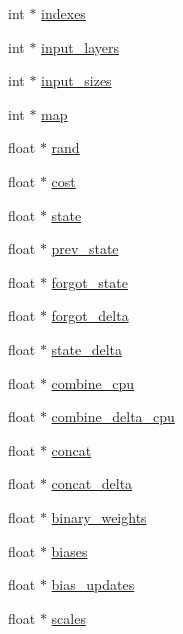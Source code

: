 \begin{DoxyCompactItemize}
\item 
int $\ast$ \mbox{\hyperlink{structlayer_a545ce2f1db475b370db778c433913fde}{indexes}}
\item 
int $\ast$ \mbox{\hyperlink{structlayer_afd5797d71336f51f9b5b1bd1ef0bddd8}{input\+\_\+layers}}
\item 
int $\ast$ \mbox{\hyperlink{structlayer_aef52d6a821c836ddd1b1993911c648f2}{input\+\_\+sizes}}
\item 
int $\ast$ \mbox{\hyperlink{structlayer_a9950b1b44120256269e082cb5efbd42e}{map}}
\item 
float $\ast$ \mbox{\hyperlink{structlayer_a254a888ee1b4383a7ce6035a88e7b825}{rand}}
\item 
float $\ast$ \mbox{\hyperlink{structlayer_a9a71dbf0ad70f63a10787d8217633776}{cost}}
\item 
float $\ast$ \mbox{\hyperlink{structlayer_af47d59ee97d2b512e5ca64a25af476c1}{state}}
\item 
float $\ast$ \mbox{\hyperlink{structlayer_aa82477e38a85af20ebd0300cab6ea6e1}{prev\+\_\+state}}
\item 
float $\ast$ \mbox{\hyperlink{structlayer_a8c96fb4f8b4a7d7dac14d6220938bdc3}{forgot\+\_\+state}}
\item 
float $\ast$ \mbox{\hyperlink{structlayer_a03015ecf4e0ca81f3b0133c93cab1354}{forgot\+\_\+delta}}
\item 
float $\ast$ \mbox{\hyperlink{structlayer_a48c287c5df2e2cd3bea497e6a93487a6}{state\+\_\+delta}}
\item 
float $\ast$ \mbox{\hyperlink{structlayer_abf10dce2bd742799a95eb1241e0c4e71}{combine\+\_\+cpu}}
\item 
float $\ast$ \mbox{\hyperlink{structlayer_a00fca0bda761ca0a2ceaf81934b31293}{combine\+\_\+delta\+\_\+cpu}}
\item 
float $\ast$ \mbox{\hyperlink{structlayer_aa2edc68cb4713d7b34f52b27b2c0a35b}{concat}}
\item 
float $\ast$ \mbox{\hyperlink{structlayer_a1de4fac7dfc2c7c9ab387bc322246258}{concat\+\_\+delta}}
\item 
float $\ast$ \mbox{\hyperlink{structlayer_a105fc98c2adbd8d8de839e327fb284b7}{binary\+\_\+weights}}
\item 
float $\ast$ \mbox{\hyperlink{structlayer_aaa7f20cb294d09ee0011d32658675a48}{biases}}
\item 
float $\ast$ \mbox{\hyperlink{structlayer_a53f11ac2a72b28b8c3529b799f1662fd}{bias\+\_\+updates}}
\item 
float $\ast$ \mbox{\hyperlink{structlayer_a82237cebb237c586f13f0a0ab35e38a3}{scales}}

\end{DoxyCompactItemize}
